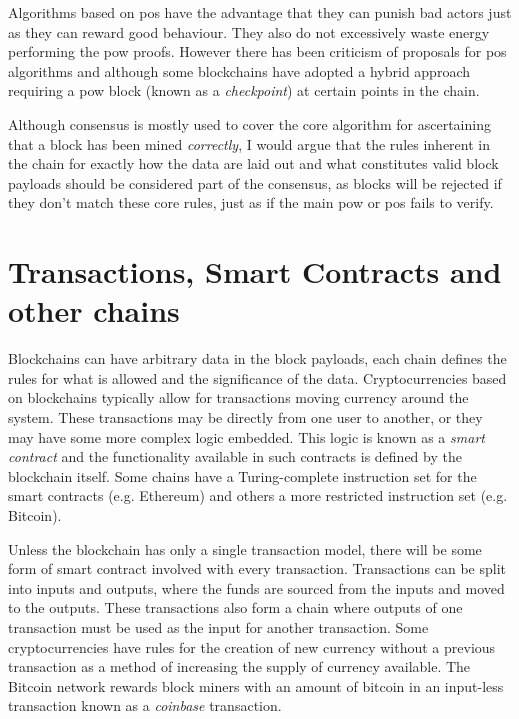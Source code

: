 Algorithms based on \gls{pos} have the advantage that they can punish bad actors just as they can reward good behaviour. They also do not excessively waste energy performing the \gls{pow} proofs. However there has been criticism of proposals for \gls{pos} algorithms  and although some blockchains  have adopted a hybrid approach requiring a \gls{pow} block (known as a \emph{checkpoint}) at certain points in the chain.

Although consensus is mostly used to cover the core algorithm for ascertaining that a block has been mined \emph{correctly}, I would argue that the rules inherent in the chain for exactly how the data are laid out and what constitutes valid block payloads should be considered part of the consensus, as blocks will be rejected if they don't match these core rules, just as if the main \gls{pow} or \gls{pos} fails to verify.

\section{Transactions, Smart Contracts and other chains}
\label{ch:blockchain:types}

Blockchains can have arbitrary data in the block payloads, each chain defines the rules for what is allowed and the significance of the data. Cryptocurrencies based on blockchains typically allow for transactions moving currency around the system. These transactions may be directly from one user to another, or they may have some more complex logic embedded. This logic is known as a \emph{smart contract} and the functionality available in such contracts is defined by the blockchain itself. Some chains have a Turing-complete instruction set for the smart contracts (e.g. Ethereum) and others a more restricted instruction set (e.g. Bitcoin).

Unless the blockchain has only a single transaction model, there will be some form of smart contract involved with every transaction. Transactions can be split into inputs and outputs, where the funds are sourced from the inputs and moved to the outputs. These transactions also form a chain where outputs of one transaction must be used as the input for another transaction. Some cryptocurrencies have rules for the creation of new currency without a previous transaction as a method of increasing the supply of currency available. The Bitcoin network rewards block miners with an amount of bitcoin in an input-less transaction known as a \emph{coinbase} transaction.

